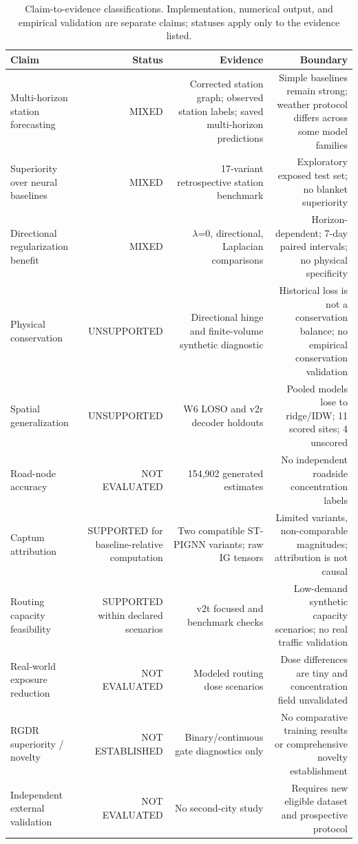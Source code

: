 \begin{table}[t]
\centering
\scriptsize
\caption{Claim-to-evidence classifications. Implementation, numerical output, and empirical validation are separate claims; statuses apply only to the evidence listed.}
\label{tab:t08_claim_evidence}
\begin{tabular}{lrrr}
\hline
Claim & Status & Evidence & Boundary \\
\hline
Multi-horizon station forecasting & MIXED & Corrected station graph; observed station labels; saved multi-horizon predictions & Simple baselines remain strong; weather protocol differs across some model families \\
Superiority over neural baselines & MIXED & 17-variant retrospective station benchmark & Exploratory exposed test set; no blanket superiority \\
Directional regularization benefit & MIXED & $\lambda$=0, directional, Laplacian comparisons & Horizon-dependent; 7-day paired intervals; no physical specificity \\
Physical conservation & UNSUPPORTED & Directional hinge and finite-volume synthetic diagnostic & Historical loss is not a conservation balance; no empirical conservation validation \\
Spatial generalization & UNSUPPORTED & W6 LOSO and v2r decoder holdouts & Pooled models lose to ridge/IDW; 11 scored sites; 4 unscored \\
Road-node accuracy & NOT EVALUATED & 154,902 generated estimates & No independent roadside concentration labels \\
Captum attribution & SUPPORTED for baseline-relative computation & Two compatible ST-PIGNN variants; raw IG tensors & Limited variants, non-comparable magnitudes; attribution is not causal \\
Routing capacity feasibility & SUPPORTED within declared scenarios & v2t focused and benchmark checks & Low-demand synthetic capacity scenarios; no real traffic validation \\
Real-world exposure reduction & NOT EVALUATED & Modeled routing dose scenarios & Dose differences are tiny and concentration field unvalidated \\
RGDR superiority / novelty & NOT ESTABLISHED & Binary/continuous gate diagnostics only & No comparative training results or comprehensive novelty establishment \\
Independent external validation & NOT EVALUATED & No second-city study & Requires new eligible dataset and prospective protocol \\
\hline
\end{tabular}
\end{table}
